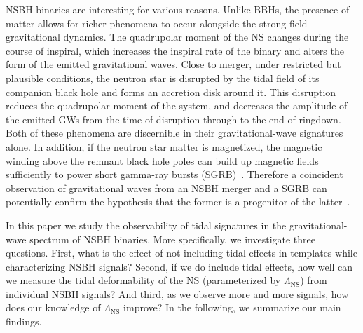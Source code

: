 \documentclass[aps,prd,amsmath,floats,floatfix, twocolumn,
superscriptaddress,nofootinbib,showpacs]{revtex4-1}
\newcommand{\lambdans}{\Lambda_\mathrm{NS}}
\begin{document}
NSBH binaries are interesting for various reasons. Unlike BBHs, the presence of
matter allows for richer phenomena to occur alongside the strong-field
gravitational dynamics. The quadrupolar moment of the NS changes during the
course of inspiral, which increases the inspiral rate of the binary and alters the
form of the emitted gravitational waves. Close to merger, under restricted but
plausible conditions, the neutron star is disrupted by the tidal field of its 
companion black hole and forms an accretion disk around it. This disruption
reduces the quadrupolar moment of the system, and decreases the amplitude of
the emitted GWs from the time of disruption through to the end of ringdown.
Both of these phenomena are discernible in their gravitational-wave signatures
alone. In addition, if the neutron star matter is magnetized, the magnetic
winding above the remnant black hole poles can build up magnetic fields
sufficiently to power short gamma-ray bursts (SGRB)~\cite{Foucart:2015a,
Lovelace:2013vma,Deaton2013,Foucart2012,Shibata:2005mz,Paschalidis2014}.
Therefore a coincident observation of gravitational waves from an NSBH merger
and a SGRB can potentially confirm the hypothesis that the former is a
progenitor of the latter~\cite{eichler:89,1992ApJ...395L..83N,moch:93,
Barthelmy:2005bx,2005Natur.437..845F,2005Natur.437..851G,Shibata:2005mz,
Tanvir:2013,Paschalidis2014}.


In this paper we study the observability of tidal signatures in the
gravitational-wave spectrum of NSBH binaries. More specifically, we investigate
three questions. First, what is the effect of not including tidal effects in 
templates while characterizing NSBH signals? Second, if we do include tidal 
effects, how well can we measure the tidal deformability of the NS
(parameterized by $\lambdans$) from individual NSBH signals? And third, as we
observe more and more signals, how does our knowledge of $\lambdans$ improve?
In the following, we summarize our main findings.
\end{document}

